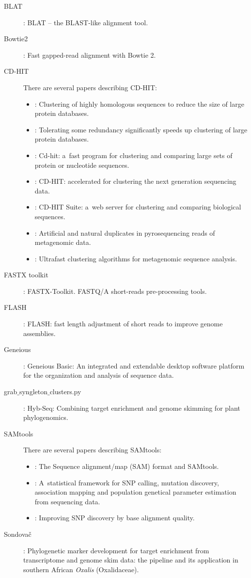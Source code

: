 \documentclass[a4paper, 11pt, twoside]{article}
\begin{document}
\begin{description}
 \item[BLAT] \citet{Kent2002}: BLAT -- the BLAST-like alignment tool.
 \item[Bowtie2] \citet{Langmead2012}: Fast gapped-read alignment with Bowtie 2.
 \item[CD-HIT] There are several papers describing CD-HIT:
  \begin{itemize}
    \item \citet{Li2001}: Clustering of highly homologous sequences to reduce the size of large protein databases.
    \item \citet{Li2002}: Tolerating some redundancy significantly speeds up clustering of large protein databases.
    \item \citet{Li2006}: Cd-hit: a~fast program for clustering and comparing large sets of protein or nucleotide sequences.
    \item \citet{Fu2012}: CD-HIT: accelerated for clustering the next generation sequencing data.
    \item \citet{Huang2010}: CD-HIT Suite: a~web server for clustering and comparing biological sequences.
    \item \citet{Niu2010}: Artificial and natural duplicates in pyrosequencing reads of metagenomic data.
    \item \citet{Li2012b}: Ultrafast clustering algorithms for metagenomic sequence analysis.
   \end{itemize}
 \item[FASTX toolkit] \citet{Gordon2010}: FASTX-Toolkit. FASTQ/A short-reads pre-processing tools.
 \item[FLASH] \citet{Magoc2011}: FLASH: fast length adjustment of short reads to improve genome assemblies.
 \item[Geneious] \citet{Kearse2012}: Geneious Basic: An integrated and extendable desktop software platform for the organization and analysis of sequence data.
 \item[grab$\_$syngleton$\_$clusters.py] \citet{Weitemier2014}: Hyb-Seq: Combining target enrichment and genome skimming for plant phylogenomics.
 \item[SAMtools] There are several papers describing SAMtools:
  \begin{itemize}
   \item \citet{Li2009}: The Sequence alignment/map (SAM) format and SAMtools.
   \item \citet{Li2011}: A~statistical framework for SNP calling, mutation discovery, association mapping and population genetical parameter estimation from sequencing data.
   \item \citet{Li2011a}: Improving SNP discovery by base alignment quality.
  \end{itemize}
 \item[Sondovač] \citet{Schmickl2016}: Phylogenetic marker development for target enrichment from transcriptome and genome skim data: the pipeline and its application in southern African \textit{Oxalis} (Oxalidaceae).
\end{description}
\end{document}
